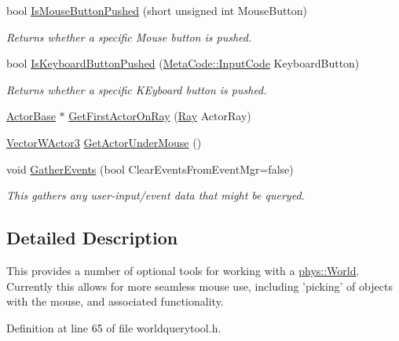 \begin{DoxyCompactItemize}
bool \hyperlink{classphys_1_1WorldQueryTool_af277b578432dfaefffbc4fd9bb80ca64}{IsMouseButtonPushed} (short unsigned int MouseButton)
\begin{DoxyCompactList}\small\item\em Returns whether a specific Mouse button is pushed. \item\end{DoxyCompactList}\item 
bool \hyperlink{classphys_1_1WorldQueryTool_a8343f54b900adb316ddc6de5405da328}{IsKeyboardButtonPushed} (\hyperlink{classphys_1_1MetaCode_a3e501cbb5bf0f6f1fdb7211465bda8d8}{MetaCode::InputCode} KeyboardButton)
\begin{DoxyCompactList}\small\item\em Returns whether a specific KEyboard button is pushed. \item\end{DoxyCompactList}\item 
\hyperlink{classphys_1_1ActorBase}{ActorBase} $\ast$ \hyperlink{classphys_1_1WorldQueryTool_a8d26735297b1c0368739f0ba05ca6a15}{GetFirstActorOnRay} (\hyperlink{classphys_1_1Ray}{Ray} ActorRay)
\item 
\hyperlink{classphys_1_1VectorWActor3}{VectorWActor3} \hyperlink{classphys_1_1WorldQueryTool_a85c3bcafc9ceea4ed485ff457d7b1f7b}{GetActorUnderMouse} ()
\item 
void \hyperlink{classphys_1_1WorldQueryTool_ae387ff047f3cdf408d8959b8cbf4cc57}{GatherEvents} (bool ClearEventsFromEventMgr=false)
\begin{DoxyCompactList}\small\item\em This gathers any user-\/input/event data that might be queryed. \item\end{DoxyCompactList}\end{DoxyCompactItemize}


\subsection{Detailed Description}
This provides a number of optional tools for working with a \hyperlink{classphys_1_1World}{phys::World}. Currently this allows for more seamless mouse use, including 'picking' of objects with the mouse, and associated functionality. 

Definition at line 65 of file worldquerytool.h.




